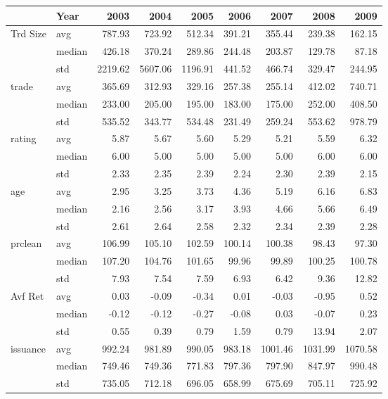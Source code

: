 \begin{tabular}{llrrrrrrr}
\toprule
 & Year & 2003 & 2004 & 2005 & 2006 & 2007 & 2008 & 2009 \\
\midrule
\multirow[t]{3}{*}{Trd Size} & avg & 787.93 & 723.92 & 512.34 & 391.21 & 355.44 & 239.38 & 162.15 \\
 & median & 426.18 & 370.24 & 289.86 & 244.48 & 203.87 & 129.78 & 87.18 \\
 & std & 2219.62 & 5607.06 & 1196.91 & 441.52 & 466.74 & 329.47 & 244.95 \\
\cline{1-9}
\multirow[t]{3}{*}{trade} & avg & 365.69 & 312.93 & 329.16 & 257.38 & 255.14 & 412.02 & 740.71 \\
 & median & 233.00 & 205.00 & 195.00 & 183.00 & 175.00 & 252.00 & 408.50 \\
 & std & 535.52 & 343.77 & 534.48 & 231.49 & 259.24 & 553.62 & 978.79 \\
\cline{1-9}
\multirow[t]{3}{*}{rating} & avg & 5.87 & 5.67 & 5.60 & 5.29 & 5.21 & 5.59 & 6.32 \\
 & median & 6.00 & 5.00 & 5.00 & 5.00 & 5.00 & 6.00 & 6.00 \\
 & std & 2.33 & 2.35 & 2.39 & 2.24 & 2.30 & 2.39 & 2.15 \\
\cline{1-9}
\multirow[t]{3}{*}{age} & avg & 2.95 & 3.25 & 3.73 & 4.36 & 5.19 & 6.16 & 6.83 \\
 & median & 2.16 & 2.56 & 3.17 & 3.93 & 4.66 & 5.66 & 6.49 \\
 & std & 2.61 & 2.64 & 2.58 & 2.32 & 2.34 & 2.39 & 2.28 \\
\cline{1-9}
\multirow[t]{3}{*}{prclean} & avg & 106.99 & 105.10 & 102.59 & 100.14 & 100.38 & 98.43 & 97.30 \\
 & median & 107.20 & 104.76 & 101.65 & 99.96 & 99.89 & 100.25 & 100.78 \\
 & std & 7.93 & 7.54 & 7.59 & 6.93 & 6.42 & 9.36 & 12.82 \\
\cline{1-9}
\multirow[t]{3}{*}{Avf Ret} & avg & 0.03 & -0.09 & -0.34 & 0.01 & -0.03 & -0.95 & 0.52 \\
 & median & -0.12 & -0.12 & -0.27 & -0.08 & 0.03 & -0.07 & 0.23 \\
 & std & 0.55 & 0.39 & 0.79 & 1.59 & 0.79 & 13.94 & 2.07 \\
\cline{1-9}
\multirow[t]{3}{*}{issuance} & avg & 992.24 & 981.89 & 990.05 & 983.18 & 1001.46 & 1031.99 & 1070.58 \\
 & median & 749.46 & 749.36 & 771.83 & 797.36 & 797.90 & 847.97 & 990.48 \\
 & std & 735.05 & 712.18 & 696.05 & 658.99 & 675.69 & 705.11 & 725.92 \\

\end{tabular}
